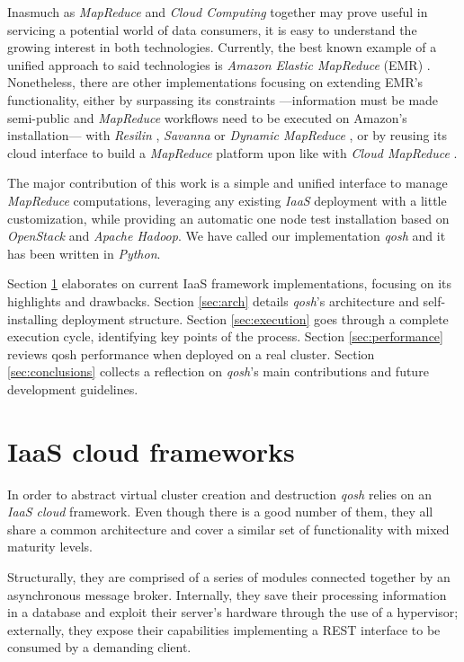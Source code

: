\documentclass{sig-alternate}
\begin{document}
Inasmuch as \emph{MapReduce} and \emph{Cloud Computing} together may prove useful in servicing a potential world of data consumers, it is easy to understand the growing interest in both technologies. Currently, the best known example of a unified approach to said technologies is \emph{Amazon Elastic MapReduce} (EMR) \cite{emr:2013:online}. Nonetheless, there are other implementations focusing on extending EMR's functionality, either by surpassing its constraints ---information must be made semi-public and \emph{MapReduce} workflows need to be executed on Amazon's installation--- with \emph{Resilin} \cite{resilin}, \emph{Savanna} \cite{savanna:2013:online} or \emph{Dynamic MapReduce} \cite{dynamicmapreduce}, or by reusing its cloud interface to build a \emph{MapReduce} platform upon like with \emph{Cloud MapReduce} \cite{cloudmapreduce}.

The major contribution of this work is a simple and unified interface to manage \emph{MapReduce} computations, leveraging any existing \emph{IaaS} deployment with a little customization, while providing an automatic one node test installation based on \emph{OpenStack} and \emph{Apache Hadoop}. We have called our implementation \emph{qosh} and it has been written in \emph{Python}.

Section \ref{sec:frameworks} elaborates on current IaaS framework implementations, focusing on its highlights and drawbacks. Section \ref{sec:arch} details \emph{qosh}'s architecture and self-installing deployment structure. Section \ref{sec:execution} goes through a complete execution cycle, identifying key points of the process. Section \ref{sec:performance} reviews qosh performance when deployed on a real cluster. Section \ref{sec:conclusions} collects a reflection on \emph{qosh}'s main contributions and future development guidelines.



\section{IaaS cloud frameworks}\label{sec:frameworks}
\noindent In order to abstract virtual cluster creation and destruction \emph{qosh} relies on an \emph{IaaS cloud} framework. Even though there is a good number of them, they all share a common architecture and cover a similar set of functionality with mixed maturity levels.

Structurally, they are comprised of a series of modules connected together by an asynchronous message broker. Internally, they save their processing information in a database and exploit their server's hardware through the use of a hypervisor; externally, they expose their capabilities implementing a REST interface to be consumed by a demanding client.
\end{document}

